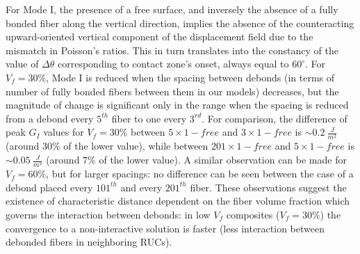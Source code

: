 \documentclass[review]{elsarticle}
\begin{document}
For Mode I, the presence of a free surface, and inversely the absence of a fully bonded fiber along the vertical direction, implies the absence of the counteracting upward-oriented vertical component of the displacement field due to the mismatch in Poisson's ratios. This in turn translates into the constancy of the value of $\Delta\theta$ corresponding to contact zone's onset, always equal to $60^{\circ}$. For $V_{f}=30\%$, Mode I is reduced when the spacing between debonds (in terms of number of fully bonded fibers between them in our models) decreases, but the magnitude of change is significant only in the range when the spacing is reduced from a debond every $5^{th}$ fiber to one every $3^{rd}$. For comparison, the difference of peak $G_{I}$ values for $V_{f}=30\%$ between $5\times 1-free$ and $3\times 1-free$ is $\sim 0.2\ \frac{J}{m^{2}}$ (around $30\%$ of the lower value), while between $201\times 1-free$ and $5\times 1-free$ is $\sim 0.05\ \frac{J}{m^{2}}$ (around $7\%$ of the lower value). A similar observation can be made for $V_{f}=60\%$, but for larger spacings: no difference can be seen between the case of a debond placed every $101^{th}$ and every $201^{th}$ fiber. These observations suggest the existence of characteristic distance dependent on the fiber volume fraction which governs the interaction between debonds: in low $V_{f}$ composites ($V_{f}=30\%$) the convergence to a non-interactive solution is faster (less interaction between debonded fibers in neighboring RUCs).
\end{document}
